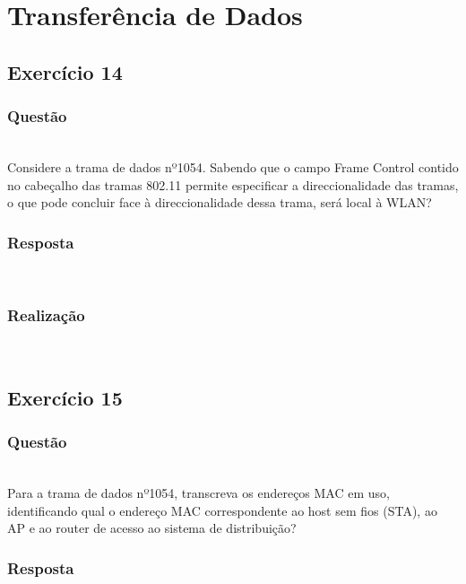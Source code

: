 \documentclass{llncs}
\begin{document}
\clearpage

\section{Transferência de Dados}
\subsection{Exercício 14}
\subsubsection{Questão}\rule[-10pt]{0pt}{10pt}\\

Considere a trama de dados nº1054. Sabendo que o campo Frame Control contido no cabeçalho das tramas 802.11 permite especificar a direccionalidade das tramas, o que pode concluir face à direccionalidade dessa trama, será local à WLAN?

\subsubsection{Resposta}\rule[-10pt]{0pt}{10pt}\\


\subsubsection{Realização}\rule[-10pt]{0pt}{10pt}\\


\clearpage
\subsection{Exercício 15}
\subsubsection{Questão}\rule[-10pt]{0pt}{10pt}\\

Para a trama de dados nº1054, transcreva os endereços MAC em uso, identificando qual o endereço MAC correspondente ao host sem fios (STA), ao AP e ao router de acesso ao sistema de distribuição?

\subsubsection{Resposta}\rule[-10pt]{0pt}{10pt}\\
\end{document}
